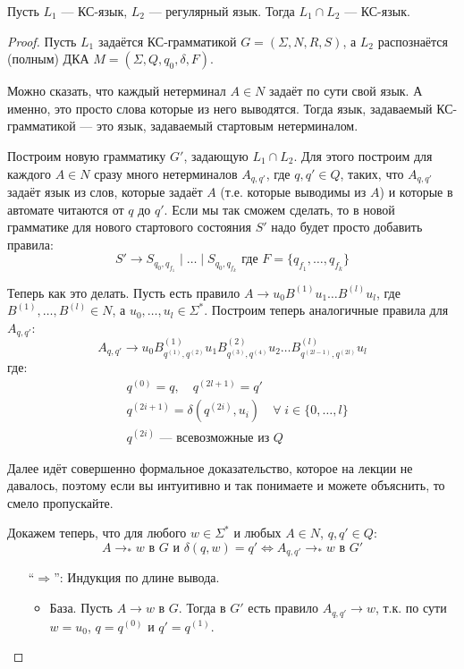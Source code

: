 \begin{theorem}
    Пусть $L_1$ --- КС-язык, $L_2$ --- регулярный язык. Тогда $L_1 \cap L_2$ --- КС-язык.
\end{theorem}
\begin{proof}
    Пусть $L_1$ задаётся КС-грамматикой $G = (\Sigma, N, R, S)$, а $L_2$ распознаётся (полным) ДКА $M = (\Sigma, Q, q_0, \delta, F)$.

    Можно сказать, что каждый нетерминал $A \in N$ задаёт по сути свой язык. А именно, это просто слова которые из него выводятся. Тогда язык, задаваемый КС-грамматикой --- это язык, задаваемый стартовым нетерминалом.

    Построим новую грамматику $G'$, задающую $L_1 \cap L_2$. Для этого построим для каждого $A \in N$ сразу много нетерминалов $A_{q, q'}$, где $q, q' \in Q$, таких, что $A_{q, q'}$ задаёт язык из слов, которые задаёт $A$ (т.е. которые выводимы из $A$) и которые в автомате читаются от $q$ до $q'$. Если мы так сможем сделать, то в новой грамматике для нового стартового состояния $S'$ надо будет просто добавить правила:
    $$ S' \to S_{q_0, q_{f_1}} \mid \dots \mid S_{q_0, q_{f_k}} \text{ где } F = \{ q_{f_1}, \dots, q_{f_k} \}$$

    Теперь как это делать. Пусть есть правило $A \to u_0 B^{(1)} u_1 \dots B^{(l)} u_l$, где $B^{(1)}, \dots, B^{(l)} \in N$, а $u_0, \dots, u_l \in \Sigma^*$. Построим теперь аналогичные правила для $A_{q, q'}$:
    $$ A_{q, q'} \to u_0 B^{(1)}_{q^{(1)}, q^{(2)}} u_1 B^{(2)}_{q^{(3)}, q^{(4)}} u_2 \dots B^{{(l)}}_{q^{(2l - 1)}, q^{(2l)}} u_l $$
    где:
    \begin{align*}
        & q^{(0)} = q, \quad q^{(2l + 1)} = q' \\
        & q^{(2i + 1)} = \delta(q^{(2i)}, u_i) \quad \forall \; i \in \{0, \dots, l\} \\
        & q^{(2i)} \text{ --- всевозможные из $Q$}
    \end{align*}

    Далее идёт совершенно формальное доказательство, которое на лекции не давалось, поэтому если вы интуитивно и так понимаете и можете объяснить, то смело пропускайте.

    Докажем теперь, что для любого $w \in \Sigma^*$ и любых $A \in N$, $q, q' \in Q$:
    $$ A \to_* w \text{ в } G \text{ и } \delta(q, w) = q' \Longleftrightarrow A_{q, q'} \to_* w \text{ в } G' $$
    \begin{itemize}
        \item[``$\Longrightarrow$'':] Индукция по длине вывода.
        \begin{itemize}
            \item База. Пусть $A \to w$ в $G$.
            Тогда в $G'$ есть правило $A_{q, q'} \to w$, т.к. по сути $w = u_0$, $q = q^{(0)}$ и $q' = q^{(1)}$. 


\end{itemize}
\end{itemize}
\end{proof}
